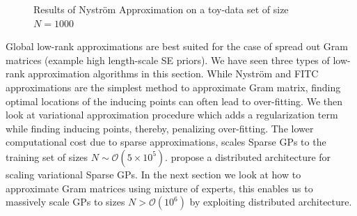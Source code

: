 \begin{figure}[!ht]
  \centering
    \quad
{}\quad
  
       \caption{Results of Nystr\"{o}m Approximation on a toy-data set of size $N=1000$ }\label{figGPPredictionNystorm}
\end{figure}

Global low-rank approximations are best suited for the case of spread out Gram matrices (example high length-scale SE priors). We have seen three types of low-rank approximation algorithms in this section. While Nystr\"{o}m and FITC approximations are the simplest method to approximate Gram matrix, finding optimal locations of the inducing points can often lead to over-fitting. We then look at variational approximation procedure which adds a regularization term while finding inducing points, thereby, penalizing over-fitting. The lower computational cost due to sparse approximations, scales Sparse GPs to the training set of sizes $N \sim \mathcal{O}(5 \times 10^5)$. \cite{Gal2014Distributed} propose a distributed architecture for scaling variational Sparse GPs. In the next section we look at how to approximate Gram matrices using mixture of experts, this enables us to massively scale GPs to sizes $N > \mathcal{O}(10^6)$ by exploiting distributed architecture.


